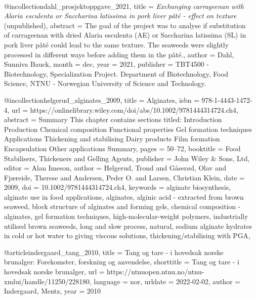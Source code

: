 
\

@incollection{dahl_prosjektoppgave_2021,
	title = {\textit{{E}xchanging carrageenan with {A}laria esculenta or {S}accharina latissima in pork liver pâté - effect on texture} (unpublished)},
	abstract = {The goal of the project was to analyse if substitution of carrageenan with dried Alaria esculenta (AE) or Saccharina latissima (SL) in pork liver pâté could lead to the same texture. The seaweeds were slightly processed in different ways before adding them in the pâté.},
	author = {Dahl, Sunniva Bauck},
	month = dec,
	year = {2021},
	publisher = {{TBT4500} - {B}iotechnology, {S}pecialization {P}roject. Department of Biotechnology, Food Science, NTNU - Norwegian University of Science {and} Technology.}
}



@incollection{helgerud_alginates_2009,
	title = {Alginates},
	isbn = {978-1-4443-1472-4},
	url = {https://onlinelibrary.wiley.com/doi/abs/10.1002/9781444314724.ch4},
	abstract = {Summary This chapter contains sections titled: Introduction Production Chemical composition Functional properties Gel formation techniques Applications Thickening and stabilising Dairy products Film formation Encapsulation Other applications Summary},
	pages = {50--72},
	booktitle = {Food Stabilisers, Thickeners and Gelling Agents},
	publisher = {John Wiley \& Sons, Ltd},
	editor = {Alan Imeson},
	author = {Helgerud, Trond and Gåserød, Olav and Fjæreide, Therese and Andersen, Peder O. and Larsen, Christian Klein},
	date = {2009},
	doi = {10.1002/9781444314724.ch4},
	keywords = {alginate biosynthesis, alginate use in food applications, alginates, alginic acid - extracted from brown seaweed, block structure of alginates and forming gels, chemical composition - alginates, gel formation techniques, high-molecular-weight polymers, industrially utilised brown seaweeds, long and slow process, natural, sodium alginate hydrates in cold or hot water to giving viscous solutions, thickening/stabilising with {PGA}},
}

@article{indergaard_tang_2010,
	title = {Tang og tare - i hovedsak norske brunalger: {Forekomster}, forskning og anvendelse},
	shorttitle = {Tang og tare - i hovedsak norske brunalger},
	url = {https://ntnuopen.ntnu.no/ntnu-xmlui/handle/11250/228180},
	language = {nor},
	urldate = {2022-02-02},
	author = {Indergaard, Mentz},
	year = {2010}
}




